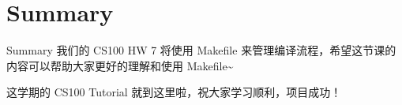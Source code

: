 \documentclass[aspectratio=169,10pt]{beamer}
\begin{document}
\section{Summary}

\begin{frame}[fragile,shrink=12]{Summary}
\footnotesize
我们的 CS100 HW 7 将使用 Makefile 来管理编译流程，希望这节课的内容可以帮助大家更好的理解和使用 Makefile\textasciitilde{}

这学期的 CS100 Tutorial 就到这里啦，祝大家学习顺利，项目成功！
\end{frame}

\end{document}
